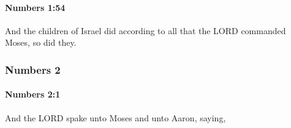 		\paragraph{Numbers 1:54} %
			\label{NUMBERS-1-54}

			And the children of Israel did according to all that the LORD commanded Moses, so did they.

	\subsubsection{Numbers 2} %
		\label{NUMBERS-2}

		\paragraph{Numbers 2:1} %
			\label{NUMBERS-2-1}

			And the LORD spake unto Moses and unto Aaron, saying,

